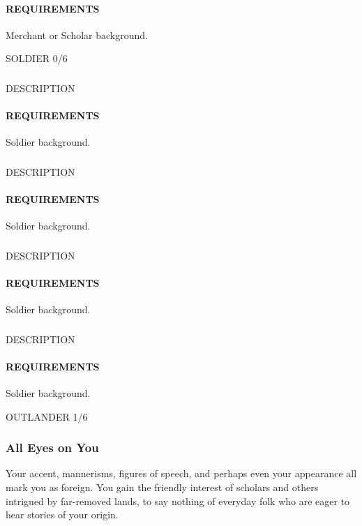     \paragraph{REQUIREMENTS} Merchant or Scholar background.

SOLDIER 0/6
    \subsubsection{} \label{feat::NAME}
    DESCRIPTION
    \paragraph{REQUIREMENTS} Soldier background.

    \subsubsection{} \label{feat::NAME}
    DESCRIPTION
    \paragraph{REQUIREMENTS} Soldier background.

    \subsubsection{} \label{feat::NAME}
    DESCRIPTION
    \paragraph{REQUIREMENTS} Soldier background.

    \subsubsection{} \label{feat::NAME}
    DESCRIPTION
    \paragraph{REQUIREMENTS} Soldier background.

OUTLANDER 1/6
    \subsubsection{All Eyes on You} \label{feat::alleyesonyou}
    Your accent, mannerisms, figures of speech, and perhaps even your appearance all mark you as foreign.
    You gain the friendly interest of scholars and others intrigued by far-removed lands, to say nothing of everyday folk who are eager to hear stories of your origin.

